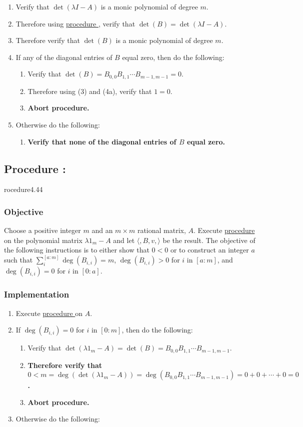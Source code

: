 \documentclass{article}
\newcounter{procedure}[part]
\newcommand{\procedure}[1]{\subsection*{Procedure \thepart:\theprocedure}\label{sec:procedure #1}\global\expandafter\edef\csname procedure#1\endcsname{\thepart:\theprocedure}\addtocounter{procedure}{1}}
\newcommand{\objective}{\subsubsection*{Objective}}
\newcommand{\implementation}{\subsubsection*{Implementation}}
\newcommand{\procedurehr}[1]{\hyperref[sec:procedure #1]{procedure \expandafter\csname procedure#1\endcsname}}
\begin{document}
\begin{multicols}{2}
\begin{enumerate}
					\item Verify that $\det(\lambda I-A)$ is a monic polynomial of degree $m$.
					\item Therefore using \procedurehr{4.27}, verify that $\det(B)=\det(\lambda I-A)$.
					\item Therefore verify that $\det(B)$ is a monic polynomial of degree $m$.
					\item If any of the diagonal entries of $B$ equal zero, then do the following:
					\begin{enumerate}
						\item Verify that $\det(B)=B_{0,0}B_{1,1}\cdots B_{m-1,m-1}=0$.
						\item Therefore using (3) and (4a), verify that $1=0$.
						\item \textbf{Abort procedure.}
					\end{enumerate}
					\item Otherwise do the following:
					\begin{enumerate}
						\item \textbf{Verify that none of the diagonal entries of $B$ equal zero.}
					\end{enumerate}
				\end{enumerate}
		\procedure{4.44}
			\objective
				Choose a positive integer $m$ and an $m\times m$ rational matrix, $A$. Execute \procedurehr{4.25} on the polynomial matrix $\lambda 1_m-A$ and let $\langle ,B,v,\rangle$ be the result. The objective of the following instructions is to either show that $0<0$ or to construct an integer $a$ such that $\sum_i^{[a:m]}\deg(B_{i,i})=m$, $\deg(B_{i,i})>0$ for $i$ in $[a:m]$, and $\deg(B_{i,i})=0$ for $i$ in $[0:a]$.
			\implementation
				\begin{enumerate}
					\item Execute \procedurehr{4.43} on $A$.
					\item If $\deg(B_{i,i})=0$ for $i$ in $[0:m]$, then do the following:
					\begin{enumerate}
						\item Verify that $\det(\lambda 1_m-A)=\det(B)=B_{0,0}B_{1,1}\cdots B_{m-1,m-1}$.
						\item \textbf{Therefore verify that $0<m=\deg(\det(\lambda 1_m-A))=\deg(B_{0,0}B_{1,1}\cdots B_{m-1,m-1})=0+0+\cdots+0=0$.}
						\item \textbf{Abort procedure.}
					\end{enumerate}
					\item Otherwise do the following:
					\begin{enumerate}

\end{enumerate}
\end{enumerate}
\end{multicols}
\end{document}
